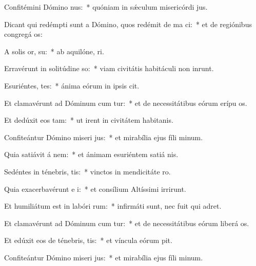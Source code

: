 \item Confitémini Dómino  nus:~* quóniam in sǽculum misericórdi jus.
\item Dicant qui redémpti sunt a Dómino, quos redémit de ma ci:~* et de regiónibus congregá os:
\item A solis or,  su:~* ab aquilóne,  ri.
\item Erravérunt in solitúdine  so:~* viam civitátis habitáculi non inrunt.
\item Esuriéntes,  tes:~* ánima eórum in ipsis cit.
\item Et clamavérunt ad Dóminum cum tur:~* et de necessitátibus eórum erípu os.
\item Et dedúxit eos   tam:~* ut irent in civitátem habitanis.
\item Confiteántur Dómino miseri jus:~* et mirabília ejus fíli minum.
\item Quia satiávit á nem:~* et ánimam esuriéntem satiá nis.
\item Sedéntes in ténebris,   tis:~* vinctos in mendicitáte  ro.
\item Quia exacerbavérunt e i:~* et consílium Altíssimi irrirunt.
\item Et humiliátum est in labóri  rum:~* infirmáti sunt, nec fuit qui adret.
\item Et clamavérunt ad Dóminum cum tur:~* et de necessitátibus eórum liberá os.
\item Et edúxit eos de ténebris,   tis:~* et víncula eórum pit.
\item Confiteántur Dómino miseri jus:~* et mirabília ejus fíli minum.
